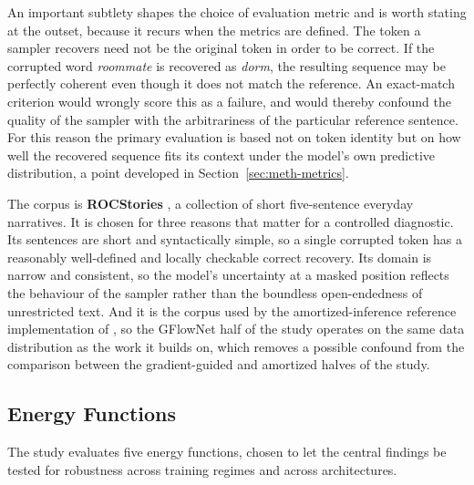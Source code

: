 An important subtlety shapes the choice of evaluation metric and is worth stating at the outset, because it recurs when the metrics are defined. The token a sampler recovers need not be the original token in order to be correct. If the corrupted word \emph{roommate} is recovered as \emph{dorm}, the resulting sequence may be perfectly coherent even though it does not match the reference. An exact-match criterion would wrongly score this as a failure, and would thereby confound the quality of the sampler with the arbitrariness of the particular reference sentence. For this reason the primary evaluation is based not on token identity but on how well the recovered sequence fits its context under the model's own predictive distribution, a point developed in Section~\ref{sec:meth-metrics}.

The corpus is \textbf{ROCStories} \citep{mostafazadeh2016corpus}, a collection of short five-sentence everyday narratives. It is chosen for three reasons that matter for a controlled diagnostic. Its sentences are short and syntactically simple, so a single corrupted token has a reasonably well-defined and locally checkable correct recovery. Its domain is narrow and consistent, so the model's uncertainty at a masked position reflects the behaviour of the sampler rather than the boundless open-endedness of unrestricted text. And it is the corpus used by the amortized-inference reference implementation of \citet{hu2024amortizing}, so the GFlowNet half of the study operates on the same data distribution as the work it builds on, which removes a possible confound from the comparison between the gradient-guided and amortized halves of the study.

\subsection{Energy Functions}
\label{sec:meth-models}

The study evaluates five energy functions, chosen to let the central findings be tested for robustness across training regimes and across architectures.

